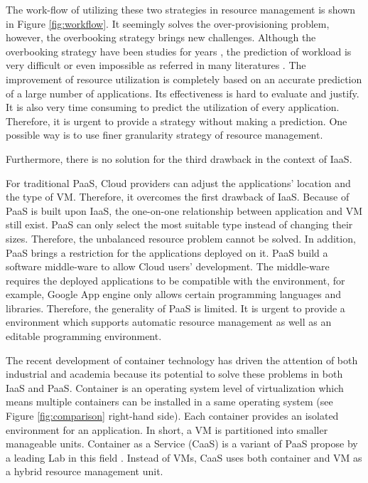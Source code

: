 The work-flow of utilizing these two strategies in resource management is shown in Figure \ref{fig:workflow}. 
It seemingly solves the over-provisioning problem, however, the overbooking strategy brings new challenges. Although the overbooking strategy have been studies for years \cite{}, the prediction of workload is very difficult \cite{} or even impossible as referred in many literatures \cite{}. The improvement of resource utilization is completely based on an accurate prediction of a large number of applications. Its effectiveness is hard to evaluate and justify. It is also very time consuming to predict the utilization of every application. Therefore, it is urgent to provide a strategy without making a prediction. One possible way is to use finer granularity strategy of resource management.

Furthermore, there is no solution for the third drawback in the context of IaaS.

For traditional PaaS, Cloud providers can adjust the applications' location and the type of VM. Therefore, it overcomes the first drawback of IaaS. Because of PaaS is built upon IaaS, the one-on-one relationship between application and VM still exist. PaaS can only select the most suitable type instead of changing their sizes. Therefore, the unbalanced resource problem cannot be solved. In addition, PaaS brings a restriction for the applications deployed on it. PaaS build a software middle-ware to allow Cloud users' development. The middle-ware requires the deployed applications to be compatible with the environment, for example, Google App engine \cite{} only allows certain programming languages and libraries. Therefore, the generality of PaaS is limited. It is urgent to provide a environment which supports automatic resource management as well as an editable programming environment.

The recent development of container technology \cite{Soltesz:2007cu} has driven the attention of both industrial and academia because its potential to solve these problems in both IaaS and PaaS.
Container is an operating system level of virtualization which means multiple containers can be installed in a same operating system (see Figure \ref{fig:comparison} right-hand side). Each container provides an isolated environment for an application. In short, a VM is partitioned into smaller manageable units. 
Container as a Service (CaaS) is a variant of PaaS propose by a leading Lab in this field \cite{Piraghaj:2015uf}. 
Instead of VMs, CaaS uses both container and VM as a hybrid resource management unit.

